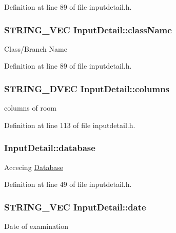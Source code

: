 Definition at line 89 of file inputdetail.\-h.

\hypertarget{classInputDetail_a6ee80d01e417bea608374ba83e17b425}{
\subsubsection[{class\-Name}]{\setlength{\rightskip}{0pt plus 5cm}S\-T\-R\-I\-N\-G\-\_\-\-V\-E\-C Input\-Detail\-::class\-Name\hspace{0.3cm}{\ttfamily [protected]}}}\label{classInputDetail_a6ee80d01e417bea608374ba83e17b425}
Class/\-Branch Name 

Definition at line 89 of file inputdetail.\-h.

\hypertarget{classInputDetail_a8563f1b6c4d2e74a9b8421a12585395c}{
\subsubsection[{columns}]{\setlength{\rightskip}{0pt plus 5cm}S\-T\-R\-I\-N\-G\-\_\-D\-V\-E\-C Input\-Detail\-::columns\hspace{0.3cm}{\ttfamily [protected]}}}\label{classInputDetail_a8563f1b6c4d2e74a9b8421a12585395c}
columns of room 

Definition at line 113 of file inputdetail.\-h.

\hypertarget{classInputDetail_a479cd6c13833bd5de6e5630078c961b6}{
\subsubsection[{database}]{ Input\-Detail\-::database\hspace{0.3cm}{\ttfamily [protected]}}}\label{classInputDetail_a479cd6c13833bd5de6e5630078c961b6}
Accecing \hyperlink{classDatabase}{Database} 

Definition at line 49 of file inputdetail.\-h.

\hypertarget{classInputDetail_a7d1c7ceb33eb86058e00c3a6a68cae4a}{
\subsubsection[{date}]{\setlength{\rightskip}{0pt plus 5cm}S\-T\-R\-I\-N\-G\-\_\-\-V\-E\-C Input\-Detail\-::date\hspace{0.3cm}{\ttfamily [protected]}}}\label{classInputDetail_a7d1c7ceb33eb86058e00c3a6a68cae4a}
Date of examination 

